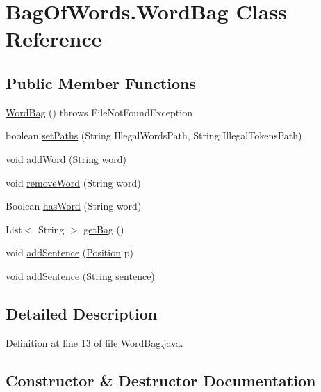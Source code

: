 \hypertarget{class_bag_of_words_1_1_word_bag}{}\section{Bag\+Of\+Words.\+Word\+Bag Class Reference}
\label{class_bag_of_words_1_1_word_bag}
\subsection*{Public Member Functions}
\begin{DoxyCompactItemize}
\item 
\hyperlink{class_bag_of_words_1_1_word_bag_a7464ca7b08fa51ee8f4967b017896a7e}{Word\+Bag} ()  throws File\+Not\+Found\+Exception
\item 
boolean \hyperlink{class_bag_of_words_1_1_word_bag_ad96f1fd5eec992c63057662c5a89e0ef}{set\+Paths} (String Illegal\+Words\+Path, String Illegal\+Tokens\+Path)
\item 
void \hyperlink{class_bag_of_words_1_1_word_bag_a3aad2cb0de46bbc029e3c8d59eb9cda3}{add\+Word} (String word)
\item 
void \hyperlink{class_bag_of_words_1_1_word_bag_a0c4bd3144d99a6b98c63f97704cfafaa}{remove\+Word} (String word)
\item 
Boolean \hyperlink{class_bag_of_words_1_1_word_bag_a1b34ea94ef1ecf6428d321b2fd5e0359}{has\+Word} (String word)
\item 
List$<$ String $>$ \hyperlink{class_bag_of_words_1_1_word_bag_ab2b3aa2a9ea3821cf365878f954a5abd}{get\+Bag} ()
\item 
void \hyperlink{class_bag_of_words_1_1_word_bag_a540190bee1fcf153d1a9f0bcb9fe2cd0}{add\+Sentence} (\hyperlink{class_reduced_invoice_1_1_position}{Position} p)
\item 
void \hyperlink{class_bag_of_words_1_1_word_bag_a9c60c49329b0ef68e47c7af85eccae00}{add\+Sentence} (String sentence)
\end{DoxyCompactItemize}


\subsection{Detailed Description}


Definition at line 13 of file Word\+Bag.\+java.



\subsection{Constructor \& Destructor Documentation}
